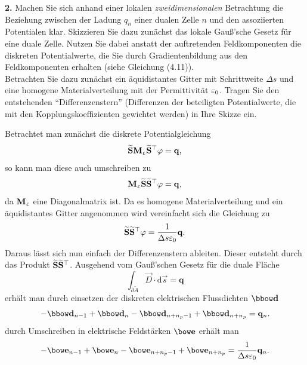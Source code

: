 \documentclass[Protokollheft.tex]{subfiles}
\begin{document}
\begin{framed}
	\noindent \textbf{2.} Machen Sie sich anhand einer lokalen \emph{zweidimensionalen}
Betrachtung die Beziehung zwischen der Ladung $q_n$ einer dualen Zelle $n$ und
den assoziierten Potentialen klar. Skizzieren
Sie dazu zunächst das lokale Gauß'sche Gesetz für eine duale
Zelle. Nutzen Sie dabei anstatt der auftretenden Feldkomponenten 
die diskreten Potentialwerte, die Sie durch Gradientenbildung aus den 
Feldkomponenten erhalten (siehe Gleichung (4.11)).\\
Betrachten Sie dazu zunächst ein äquidistantes Gitter mit
Schrittweite $\Delta s$ und eine homogene Materialverteilung mit der
Permittivität $\varepsilon_0$. Tragen Sie den entstehenden
"`Differenzenstern"' (Differenzen der beteiligten Potentialwerte,
die mit den Kopplungskoeffizienten gewichtet werden) in Ihre
Skizze ein.\label{exer:diffStar}
\end{framed}
\noindent
Betrachtet man zunächst die diskrete Potentialgleichung
\begin{equation*}
\widetilde{\mathbf{S}}\mathbf{M}_{\upvarepsilon}\widetilde{\mathbf{S}}^\top\varphi=\mathbf{q},
\end{equation*}
so kann man diese auch umschreiben zu
\begin{equation*}
	\mathbf{M}_{\upvarepsilon}\widetilde{\mathbf{S}}\widetilde{\mathbf{S}}^\top\varphi=\mathbf{q},
\end{equation*}
da $\mathbf{M}_{\upvarepsilon}$ eine Diagonalmatrix ist. Da es homogene Materialverteilung und ein äquidistantes Gitter angenommen wird vereinfacht sich die Gleichung zu
\begin{equation*}
	\widetilde{\mathbf{S}}\widetilde{\mathbf{S}}^\top\varphi=\frac{1}{\Delta s\varepsilon_0}\mathbf{q}.
	\label{eq:SSphi}
\end{equation*}
Daraus lässt sich nun einfach der Differenzenstern ableiten. Dieser entsteht durch das Produkt $\widetilde{\mathbf{S}}\widetilde{\mathbf{S}}^\top$. Ausgehend vom Gauß'schen Gesetz für die duale Fläche
\begin{equation*}
\int_{\partial \tilde{A}}\vec{D}\cdot\text{d}\vec{s}=\mathbf{q}
\end{equation*}
erhält man durch einsetzen der diskreten elektrischen Flussdichten $\dfit$
\begin{equation*}
-\dfit_{n-1}+\dfit_{n}-\dfit_{n+n_p-1}+\dfit_{n+n_p}=\mathbf{q}_n.
\end{equation*}
durch Umschreiben in elektrische Feldstärken $\efit$ erhält man
\begin{equation*}
	-\efit_{n-1}+\efit_{n}-\efit_{n+n_p-1}+\efit_{n+n_p}=\frac{1}{\Delta s\varepsilon_0}\mathbf{q}_n.
\end{equation*}
\end{document}

